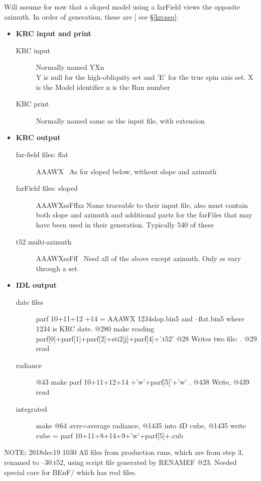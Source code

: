 \documentclass{article}
\begin{document}
 Will assume for now that a sloped model using a farField views the opposite
 azimuth.  In order of generation, these are [ see \S \ref{krcseq}:
\begin{itemize}
\item \textbf{KRC input and print} 
\begin{description}  %
\item [KRC input] Normally named  YXn
\\ Y is null for the high-obliquity set and 'E' for the true spin axis set.
\qi X is the Model identifier
\qi n is the Run number
 
\item [KRC print] Normally named same as the input file, with extension  
 \end{description} 
\item \textbf{KRC output}
\begin{description}  %
\item [far-field files: flat] AAAWX \ As for sloped below, without slope and azimuth
\item [farField files: sloped] AAAWXssFffzz  Name traceable to
 their input file, also must contain both slope and azimuth and additional 
parts for the farFiles that may have been used in their generation.  
Typically 540 of these   
\item [t52 multi-azimuth] AAAWXssFff \ Need all of the above except azimuth. Only ss vary through a set.
 \end{description} 
\item \textbf{IDL output}
\begin{description}  %
\item [date files] parf 10+11+12 +14 = AAAWX 1234slop.bin5 and --flat.bin5 where 1234 is KRC date.  
\qi @280 make reading parf[0]+parf[1]+parf[2]+sti2[j]+parf[4]+'.t52'
\qi  @28 Writes two file: .  @29 read
\item [radiance]   @43 make parf 10+11+12+14 +'w'+parf[5]'+'w' .    @438 Write, @439 read
\item [integrated]  make @64 avrr=average radiance, @1435 into 4D cube, @1435 write cube =  parf 10+11+8+14+9+'w'+parf[5]+.cub 
 \end{description} 
\end{itemize}

NOTE: 2018dec19 1030 All  files from
production runs, which are from step 3, renamed to --30.t52, using 
script file generated by RENAMEF @23. Needed special care for BEnF/ which has
real  files.
\end{document}
